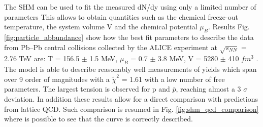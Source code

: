 \documentclass[12pt,a4paper]{book}
\begin{document}
	The SHM can be used to fit the measured dN/dy using only a limited number of parameters This allows to obtain quantities such as the chemical freeze-out temperature, the system volume V and the chemical potential $\mu_B$. Results Fig. \ref{fig:particle_abbundance} show how the best fit parameters to describe the data from Pb–Pb central collisions collected by the ALICE experiment at $\sqrt{s_{NN}}$ = 2.76 TeV are: T = 156.5 $\pm$ 1.5 MeV, $\mu_B$ = 0.7 $\pm$ 3.8 MeV, V = 5280 $\pm$ 410 $fm^3$ . The model is able to describe reasonably well measurements of yields which span over 9 order of magnitudes with a $\tilde{\chi}^2$ = 1.61 with a low number of free parameters. The largest tension is observed for p and $\bar{p}$, reaching almost a 3 $\sigma$ deviation. \cite{Andronic_2017} In addition these results allow for a direct comparison with predictions from lattice QCD. Such comparison is resumed in Fig. \ref{fig:shm_qcd_comparison} where is possible to see that the curve is correctly described.
	
\end{document}

